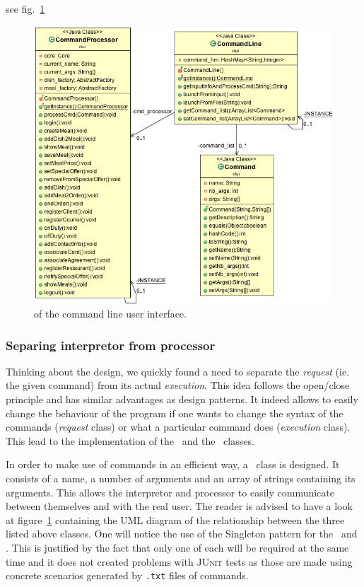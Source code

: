 see fig.~\ref{fig:clui_uml}

\begin{figure}
  \begin{center}
    \includegraphics[scale=0.5]{./img/CLUI.png}
    \end{center}
  \caption{\umld of the command line user interface.}
  \label{fig:clui_uml}
\end{figure}

\subsubsection{Separing interpretor from processor} %
\label{sub:separing_command_getter_and_command_processor}

Thinking about the design, we quickly found a need to separate
the \emph{request} (ie. the given command) from its actual \emph{execution}.
This idea follows the open/close principle and has similar advantages
as design patterns.
It indeed allows to easily change the behaviour of the program if
one wants to change the syntax of the commands (\emph{request} class)
or what a particular command does (\emph{execution} class).
This lead to the implementation of the \CommandLine~and
the \CommandProcessor~classes.

In order to make use of commands in an efficient way,
a \Command~class is designed.
It consists of a name, a number of arguments and an array
of strings containing its arguments.
This allows the interpretor and processor to easily
communicate between themselves and with the real user.
The reader is advised to have a look at figure~\ref{fig:clui_uml}
containing the UML diagram of the relationship between
the three listed above classes.
One will notice the use of the Singleton pattern for
the \CommandProcessor~and \CommandLine.
This is justified by the fact that only one
of each will be required at the same time
and it does not created problems with \textsc{JUnit} tests
as those are made using concrete scenarios
generated by \texttt{.txt} files of commands.

